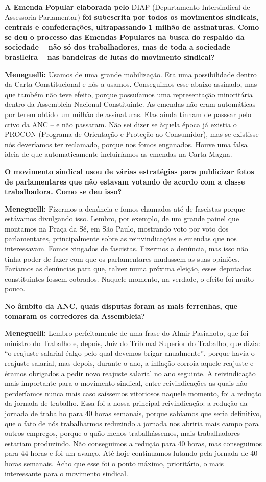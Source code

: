 \textbf{A Emenda Popular elaborada pelo} DIAP (Departamento
Intersindical de Assessoria Parlamentar) \textbf{foi subescrita por
todos os movimentos sindicais, centrais e confederações, ultrapassando 1
milhão de assinaturas. Como se deu o processo das Emendas Populares na
busca do respaldo da sociedade -- não só dos trabalhadores, mas de toda
a sociedade brasileira -- nas bandeiras de lutas do movimento sindical?}

\textbf{Meneguelli:} Usamos de uma grande mobilização. Era uma
possibilidade dentro da Carta Constitucional e nós a usamos. Conseguimos
esse abaixo-assinado, mas que também não teve efeito, porque possuíamos
uma representação minoritária dentro da Assembleia Nacional
Constituinte. As emendas não eram automáticas por terem obtido um milhão
de assinaturas. Elas ainda tinham de passsar pelo crivo da ANC -- e não
passaram. Não sei dizer se àquela época já existia o PROCON (Programa de
Orientação e Proteção ao Consumidor), mas se existisse nós deveríamos
ter reclamado, porque nos fomos enganados. Houve uma falsa ideia de que
automaticamente incluiríamos as emendas na Carta Magna.

\textbf{O movimento sindical usou de várias estratégias para publicizar
fotos de parlamentares que não estavam votando de acordo com a classe
trabalhadora. Como se deu isso?}

\textbf{Meneguelli:} Fizermos a denúncia e fomos chamados até de
fascistas porque estávamos divulgando isso. Lembro, por exemplo, de um
grande painel que montamos na Praça da Sé, em São Paulo, mostrando voto
por voto dos parlamentares, principalmente sobre as reinvindicações e
emendas que nos interessavam. Fomos xingados de fascistas. Fizermos a
denúncia, mas isso não tinha poder de fazer com que os parlamentares
mudassem as suas opiniões. Fazíamos as denúncias para que, talvez numa
próxima eleição, esses deputados constituintes fossem cobrados. Naquele
momento, na verdade, o efeito foi muito pouco.

\textbf{No âmbito da ANC, quais disputas foram as mais ferrenhas, que
tomaram os corredores da Assembleia?}

\textbf{Meneguelli:} Lembro perfeitamente de uma frase do Almir
Pasianoto, que foi ministro do Trabalho e, depois, Juíz do Tribunal
Superior do Trabalho, que dizia: ``o reajuste salarial éalgo pelo qual
devemos brigar anualmente'', porque havia o reajuste salarial, mas
depois, durante o ano, a inflação corroía aquele reajuste e éramos
obrigados a pedir novo reajuste salarial no ano seguinte. A
reivindicação mais importante para o movimento sindical, entre
reivindicações as quais não perderíamos nunca mais caso saíssemos
vitoriosos naquele momento, foi a redução da jornada de trabalho. Essa
foi a nossa principal reivindicação: a redução da jornada de trabalho
para 40 horas semanais, porque sabíamos que seria definitivo, que o fato
de nós trabalharmos reduzindo a jornada nos abriria mais campo para
outros empregos, porque o quão menos trabalhássemos, mais trabalhadores
estariam produzindo. Não conseguimos a redução para 40 horas, mas
conseguimos para 44 horas e foi um avanço. Até hoje continuamos lutando
pela jornada de 40 horas semanais. Acho que esse foi o ponto máximo,
prioritário, o mais interessante para o movimento sindical.

